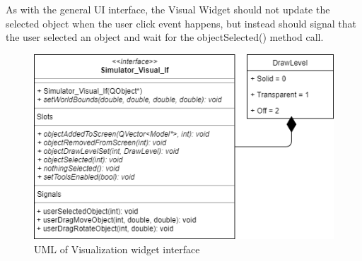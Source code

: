   As with the general UI interface, the Visual Widget should not update the selected object when the user click event happens, but instead should signal that the user selected an object and wait for the objectSelected() method call.
 \begin{figure}[h]
 	\begin{center}
 	\includegraphics[scale=0.5]{./images_design/uml/Visual_If}
 	\caption{UML of Visualization widget interface\label{uml:visual_if}}
 	\end{center}
 \end{figure}

